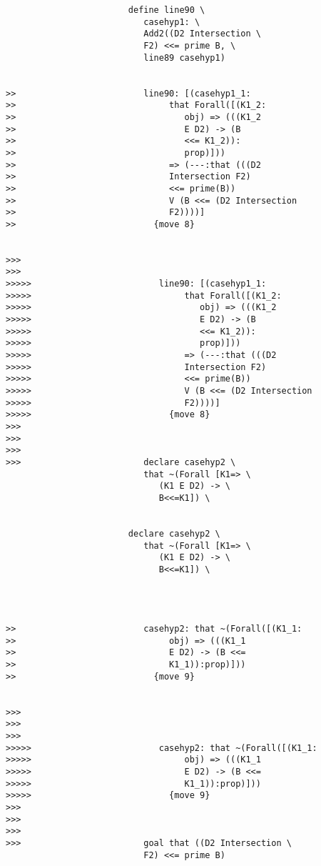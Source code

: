 \documentclass[12pt]{article}
\begin{document}
\begin{verbatim}
                        define line90 \
                           casehyp1: \
                           Add2((D2 Intersection \
                           F2) <<= prime B, \
                           line89 casehyp1)


>>                         line90: [(casehyp1_1:
>>                              that Forall([(K1_2:
>>                                 obj) => (((K1_2
>>                                 E D2) -> (B
>>                                 <<= K1_2)):
>>                                 prop)]))
>>                              => (---:that (((D2
>>                              Intersection F2)
>>                              <<= prime(B))
>>                              V (B <<= (D2 Intersection
>>                              F2))))]
>>                           {move 8}


>>>
>>>
>>>>>                         line90: [(casehyp1_1:
>>>>>                              that Forall([(K1_2:
>>>>>                                 obj) => (((K1_2
>>>>>                                 E D2) -> (B
>>>>>                                 <<= K1_2)):
>>>>>                                 prop)]))
>>>>>                              => (---:that (((D2
>>>>>                              Intersection F2)
>>>>>                              <<= prime(B))
>>>>>                              V (B <<= (D2 Intersection
>>>>>                              F2))))]
>>>>>                           {move 8}
>>>
>>>
>>>
>>>                        declare casehyp2 \
                           that ~(Forall [K1=> \
                              (K1 E D2) -> \
                              B<<=K1]) \
                           

                        declare casehyp2 \
                           that ~(Forall [K1=> \
                              (K1 E D2) -> \
                              B<<=K1]) \
                           



>>                         casehyp2: that ~(Forall([(K1_1:
>>                              obj) => (((K1_1
>>                              E D2) -> (B <<=
>>                              K1_1)):prop)]))
>>                           {move 9}


>>>
>>>
>>>
>>>>>                         casehyp2: that ~(Forall([(K1_1:
>>>>>                              obj) => (((K1_1
>>>>>                              E D2) -> (B <<=
>>>>>                              K1_1)):prop)]))
>>>>>                           {move 9}
>>>
>>>
>>>
>>>                        goal that ((D2 Intersection \
                           F2) <<= prime B)


\end{verbatim}
\end{document}
